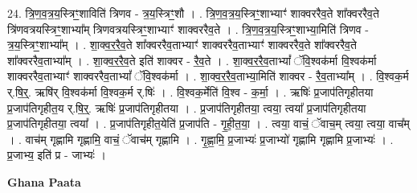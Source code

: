 \documentclass[17pt]{extarticle}
\begin{document}
24. त्रि॒ण॒व॒त्र॒य॒स्त्रिꣳ॒॒शाविति॑ त्रिणव - त्र॒य॒स्त्रिꣳ॒॒शौ । . त्रि॒ण॒व॒त्र॒य॒स्त्रिꣳ॒॒शाभ्याꣳ॑ शाक्वररैव॒ते शा᳚क्वररैव॒ते त्रि॑णवत्रयस्त्रिꣳ॒॒शाभ्या᳚म् त्रिणवत्रयस्त्रिꣳ॒॒शाभ्याꣳ॑ शाक्वररैव॒ते । . त्रि॒ण॒व॒त्र॒य॒स्त्रिꣳ॒॒शाभ्या॒मिति॑ त्रिणव - त्र॒य॒स्त्रिꣳ॒॒शाभ्या᳚म् । . शा॒क्व॒र॒रै॒व॒ते शा᳚क्वररैव॒ताभ्याꣳ॑ शाक्वररैव॒ताभ्याꣳ॑ शाक्वररैव॒ते शा᳚क्वररैव॒ते शा᳚क्वररैव॒ताभ्या᳚म् । . शा॒क्व॒र॒रै॒व॒ते इति॑ शाक्वर - रै॒व॒ते । . शा॒क्व॒र॒रै॒व॒ताभ्यां᳚ ॅवि॒श्वक॑र्मा वि॒श्वक॑र्मा शाक्वररैव॒ताभ्याꣳ॑ शाक्वररैव॒ताभ्यां᳚ ॅवि॒श्वक॑र्मा । . शा॒क्व॒र॒रै॒व॒ताभ्या॒मिति॑ शाक्वर - रै॒व॒ताभ्या᳚म् । . वि॒श्वक॒र्म र्.षि॒र्॒. ऋषि॑र् वि॒श्वक॑र्मा वि॒श्वक॒र्म र्.षिः॑ । . वि॒श्वक॒र्मेति॑ वि॒श्व - क॒र्मा॒ । . ऋषिः॑ प्र॒जाप॑तिगृहीतया प्र॒जाप॑तिगृहीत॒य र्.षि॒र्॒. ऋषिः॑ प्र॒जाप॑तिगृहीतया । . प्र॒जाप॑तिगृहीतया॒ त्वया॒ त्वया᳚ प्र॒जाप॑तिगृहीतया प्र॒जाप॑तिगृहीतया॒ त्वया᳚ । . प्र॒जाप॑तिगृहीत॒येति॑ प्र॒जाप॑ति - गृ॒ही॒त॒या॒ । . त्वया॒ वाचं॒ ॅवाच॒म् त्वया॒ त्वया॒ वाच᳚म् । . वाच॑म् गृह्णामि गृह्णामि॒ वाचं॒ ॅवाच॑म् गृह्णामि । . गृ॒ह्णा॒मि॒ प्र॒जाभ्यः॑ प्र॒जाभ्यो॑ गृह्णामि गृह्णामि प्र॒जाभ्यः॑ । . प्र॒जाभ्य॒ इति॑ प्र - जाभ्यः॑ । \newline

\textbf{Ghana Paata } \newline
\end{document}

